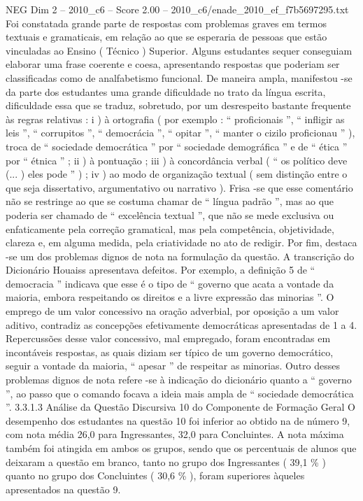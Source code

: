 \begin{textsample}{NEG Dim 2 – 2010\_c6 – Score 2.00 – 2010\_c6/enade\_2010\_ef\_f7b5697295.txt}
Foi constatada grande parte de respostas com problemas graves em termos textuais e gramaticais, em relação ao que se esperaria de pessoas que estão vinculadas ao Ensino ( Técnico ) Superior.
Alguns estudantes sequer conseguiam elaborar uma frase coerente e coesa, apresentando respostas que poderiam ser classificadas como de analfabetismo funcional.
De maneira ampla, manifestou -se da parte dos estudantes uma grande dificuldade no trato da língua escrita, dificuldade essa que se traduz, sobretudo, por um desrespeito bastante frequente às regras relativas : i ) à ortografia ( por exemplo : “ proficionais ”, “ infligir as leis ”, “ corrupitos ”, “ democrácia ”, “ opitar ”, “ manter o cizilo proficionau ” ), troca de “ sociedade democrática ” por “ sociedade demográfica ” e de “ ética ” por “ étnica ” ; ii ) à pontuação ; iii ) à concordância verbal ( “ os político deve (... ) eles pode ” ) ; iv ) ao modo de organização textual ( sem distinção entre o que seja dissertativo, argumentativo ou narrativo ).
Frisa -se que esse comentário não se restringe ao que se costuma chamar de “ língua padrão ”, mas ao que poderia ser chamado de “ excelência textual ”, que não se mede exclusiva ou enfaticamente pela correção gramatical, mas pela competência, objetividade, clareza e, em alguma medida, pela criatividade no ato de redigir.
Por fim, destaca -se um dos problemas dignos de nota na formulação da questão.
A transcrição do Dicionário Houaiss apresentava defeitos.
Por exemplo, a definição 5 de “ democracia ” indicava que esse é o tipo de “ governo que acata a vontade da maioria, embora respeitando os direitos e a livre expressão das minorias ”.
O emprego de um valor concessivo na oração adverbial, por oposição a um valor aditivo, contradiz as concepções efetivamente democráticas apresentadas de 1 a 4.
Repercussões desse valor concessivo, mal empregado, foram encontradas em incontáveis respostas, as quais diziam ser típico de um governo democrático, seguir a vontade da maioria, “ apesar ” de respeitar as minorias.
Outro desses problemas dignos de nota refere -se à indicação do dicionário quanto a “ governo ”, ao passo que o comando focava a ideia mais ampla de “ sociedade democrática ”. 3.3.1.3 Análise da Questão Discursiva 10 do Componente de Formação Geral O desempenho dos estudantes na questão 10 foi inferior ao obtido na de número 9, com nota média 26,0 para Ingressantes, 32,0 para Concluintes.
A nota máxima também foi atingida em ambos os grupos, sendo que os percentuais de alunos que deixaram a questão em branco, tanto no grupo dos Ingressantes ( 39,1 \% ) quanto no grupo dos Concluintes ( 30,6 \% ), foram superiores àqueles apresentados na questão 9.

\end{textsample}
